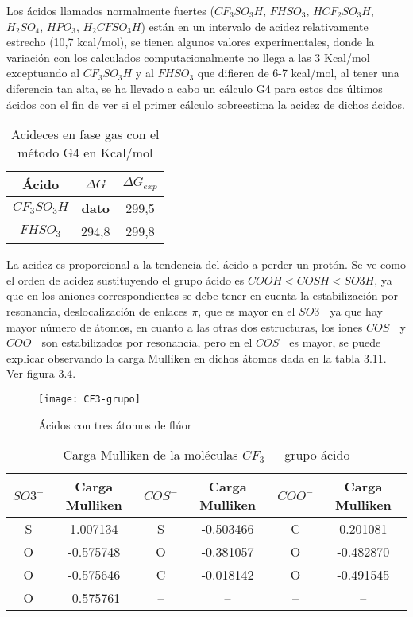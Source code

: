 Los ácidos llamados normalmente fuertes ($ CF_3SO_3H$, $FHSO_3$, $HCF_2SO_3H$, $H_2SO_4$, $HPO_3$, $H_2CFSO_3H$) están en un intervalo de acidez relativamente estrecho (10,7 kcal/mol), se tienen algunos valores experimentales, donde la variación con los calculados computacionalmente no llega a las 3 Kcal/mol exceptuando al $CF_3SO_3H$ y al $FHSO_3$ que difieren de 6-7 kcal/mol, al tener una diferencia tan alta, se ha llevado a cabo un cálculo G4 para estos dos últimos ácidos con el fin de ver si el primer cálculo sobreestima la acidez de dichos ácidos. 
\begin{table}[H]
	\centering
	\begin{tabular}{|c|c|c|}
		\hline
		Ácido & $\Delta G$ & $\Delta G_{exp}$ \\ \hline
		$CF_3SO_3H$ &{\bfseries dato }& 299,5 \\ \hline
		$FHSO_3$ & 294,8 & 299,8 \\ \hline 
	\end{tabular}
\caption{Acideces en fase gas con el método G4 en Kcal/mol}
\end{table}

La acidez es proporcional a la tendencia del ácido a perder un protón. Se ve como el orden de acidez sustituyendo el grupo ácido es $ COOH {<} COSH {<} SO3H $, ya que en los aniones correspondientes se debe tener en cuenta la estabilización por resonancia, deslocalización de enlaces $\pi$, que es mayor en el $SO3^-$ ya que hay mayor número de átomos, en cuanto a las otras dos estructuras, los iones $COS^-$ y $COO^-$ son estabilizados por resonancia, pero en el $COS^-$ es mayor, se puede explicar observando la carga Mulliken en dichos átomos dada en la tabla 3.11. Ver figura 3.4.

\begin{figure}[H]
	\centering
	\texttt{[image: CF3-grupo]}
	\caption{Ácidos con tres átomos de flúor}
\end{figure}

\begin{table}[H]
    \centering
    \begin{tabular}{|c|c|c|c|c|c|}
    \hline
    $SO3^-$ & Carga Mulliken &$COS^-$ & Carga Mulliken & $COO^-$ & Carga Mulliken \\ \hline
    S & 1.007134 & S & -0.503466 & C & 0.201081 \\ \hline
    O & -0.575748 & O & -0.381057 & O & -0.482870 \\ \hline
    O & -0.575646 & C & -0.018142 & O & -0.491545 \\ \hline
    O & -0.575761 & -- & -- & -- & -- \\ \hline
    \end{tabular}
    \caption{Carga Mulliken de la moléculas $CF_3-$ grupo ácido}
\end{table}

